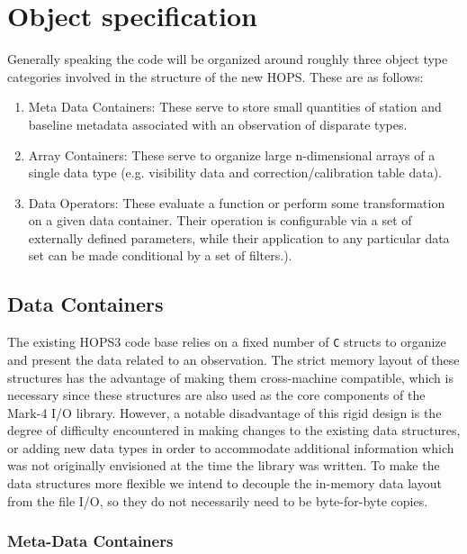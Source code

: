 
\section{Object specification}
\label{sec:objects}


Generally speaking the code will be organized around roughly three object type categories involved in the structure of the new HOPS. These are as follows:

\begin{enumerate}
 \item Meta Data Containers: These serve to store small quantities of station and baseline metadata associated with an observation of disparate types.
 \item Array Containers: These serve to organize large n-dimensional arrays of a single data type (e.g. visibility data and correction/calibration table data).
 \item Data Operators: These evaluate a function or perform some transformation on a given data container. Their operation is configurable via a set of externally defined parameters, while their application to any particular data set can be made conditional by a set of filters.).
\end{enumerate}

\subsection{Data Containers}

The existing HOPS3 code base relies on a fixed number of \texttt{C} structs to organize and present the data related to an observation. The strict memory layout of these structures has the advantage of making them cross-machine compatible, which is necessary since these structures are also used as the core components of the Mark-4 I/O library. However, a notable disadvantage of this rigid design is the degree of difficulty encountered in making changes to the existing data structures, or adding new data types in order to accommodate additional information which was not originally envisioned at the time the library was written. To make the data structures more flexible we intend to decouple the in-memory data layout from the file I/O, so they do not necessarily need to be byte-for-byte copies.

\subsubsection{Meta-Data Containers}

